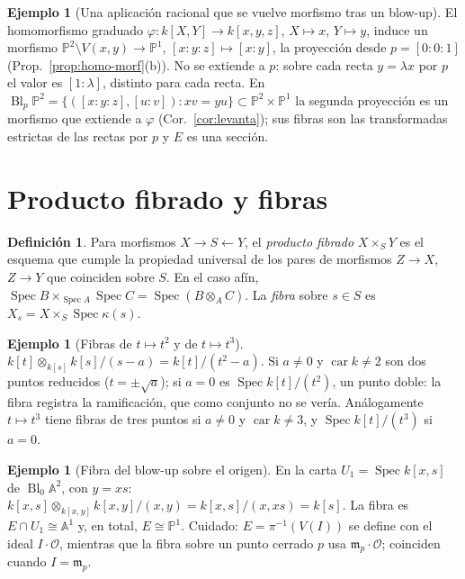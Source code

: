 \documentclass[11pt,a4paper,oneside]{book}
\newcommand{\Spec}{\operatorname{Spec}}
\newcommand{\Bl}{\operatorname{Bl}}
\newcommand{\A}{\mathbb{A}}
\newcommand{\PP}{\mathbb{P}}
\newcommand{\cO}{\mathcal{O}}
\theoremstyle{plain}
\theoremstyle{definition}
\newtheorem{definicion}[teorema]{Definición}
\newtheorem{ejemplo}[teorema]{Ejemplo}
\theoremstyle{remark}
\begin{document}
\begin{ejemplo}[Una aplicación racional que se vuelve morfismo tras un blow-up]\label{ej:proyeccion-ap}
El homomorfismo graduado $\varphi\colon k[X,Y]\to k[x,y,z]$, $X\mapsto x$, $Y\mapsto y$, induce un morfismo $\PP^2\setminus V(x,y)\to\PP^1$, $[x:y:z]\mapsto[x:y]$, la proyección desde $p=[0:0:1]$ (Prop.~\ref{prop:homo-morf}(b)). No se extiende a $p$: sobre cada recta $y=\lambda x$ por $p$ el valor es $[1:\lambda]$, distinto para cada recta. En $\Bl_p\PP^2=\{([x:y:z],[u:v]): xv=yu\}\subset\PP^2\times\PP^1$ la segunda proyección es un morfismo que extiende a $\varphi$ (Cor.~\ref{cor:levanta}); sus fibras son las transformadas estrictas de las rectas por $p$ y $E$ es una sección.
\end{ejemplo}

\section{Producto fibrado y fibras}

\begin{definicion}
Para morfismos $X\to S\leftarrow Y$, el \emph{producto fibrado} $X\times_SY$ es el esquema que cumple la propiedad universal de los pares de morfismos $Z\to X$, $Z\to Y$ que coinciden sobre $S$. En el caso afín, $\Spec B\times_{\Spec A}\Spec C=\Spec(B\otimes_AC)$. La \emph{fibra} sobre $s\in S$ es $X_s=X\times_S\Spec\kappa(s)$.
\end{definicion}

\begin{ejemplo}[Fibras de $t\mapsto t^2$ y de $t\mapsto t^3$]
$k[t]\otimes_{k[s]}k[s]/(s-a)=k[t]/(t^2-a)$. Si $a\ne0$ y $\operatorname{car}k\ne2$ son dos puntos reducidos ($t=\pm\sqrt a$); si $a=0$ es $\Spec k[t]/(t^2)$, un punto doble: la fibra registra la ramificación, que como conjunto no se vería. Análogamente $t\mapsto t^3$ tiene fibras de tres puntos si $a\ne0$ y $\operatorname{car}k\ne3$, y $\Spec k[t]/(t^3)$ si $a=0$.
\end{ejemplo}

\begin{ejemplo}[Fibra del blow-up sobre el origen]\label{ej:fibra}
En la carta $U_1=\Spec k[x,s]$ de $\Bl_0\A^2$, con $y=xs$: $k[x,s]\otimes_{k[x,y]}k[x,y]/(x,y)=k[x,s]/(x,xs)=k[s]$. La fibra es $E\cap U_1\cong\A^1$ y, en total, $E\cong\PP^1$. Cuidado: $E=\pi^{-1}(V(I))$ se define con el ideal $I\cdot\cO$, mientras que la fibra sobre un punto cerrado $p$ usa $\mathfrak m_p\cdot\cO$; coinciden cuando $I=\mathfrak m_p$.
\end{ejemplo}
\end{document}
